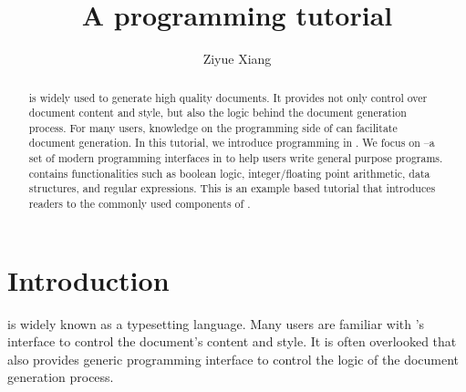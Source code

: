 \documentclass{ltugboat}
\title{A \LTT{} programming tutorial}
\author{Ziyue Xiang}
\begin{document}
\begin{abstract}
\LT{} is widely used to generate high quality documents.
It provides not only control over document content and style, but also the logic behind the document generation process.
For many users, knowledge on the programming side of \LT{} can facilitate document generation.
In this tutorial, we introduce programming in \LT{}.
We focus on \LTT{}--a set of modern programming interfaces in \LT{} to help users write general purpose programs.
\LTT{} contains functionalities such as boolean logic, integer/floating point arithmetic, data structures, and regular expressions.
This is an example based \LTT{} tutorial that introduces readers to the commonly used components of \LTT{}.
\end{abstract}

\maketitle

\tableofcontents
\ListOfCodeExample


\section{Introduction}

\LT{} is widely known as a typesetting language.
Many \LT{} users are familiar with \LT{}'s interface to control the document's content and style.
It is often overlooked that \LT{} also provides generic programming interface to control the logic of the document generation process.





\end{document}
